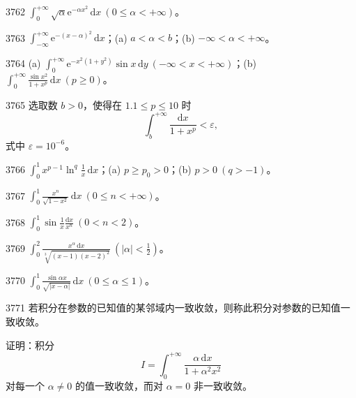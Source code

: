 \begin{prob}[S]{3762}
$\int_{0}^{+\infty} \sqrt{\alpha}\mathrm{e}^{-\alpha x^2}\,\mathrm{d}x \ (0 \leqslant \alpha < +\infty)$。
\end{prob}

\begin{prob}[M]{3763}
$\int_{-\infty}^{+\infty} \mathrm{e}^{-(x-\alpha)^2}\,\mathrm{d}x$；(a) $a < \alpha < b$；(b) $-\infty < \alpha < +\infty$。
\end{prob}

\begin{prob}[M]{3764}
(a) $\int_{0}^{+\infty} \mathrm{e}^{-x^2(1+y^2)} \sin x\,\mathrm{d}y \ (-\infty < x < +\infty)$；\qquad (b) $\int_{0}^{+\infty} \frac{\sin x^2}{1+x^p}\,\mathrm{d}x \ (p \geqslant 0)$。
\end{prob}

\begin{prob}[M]{3765}
选取数 $b > 0$，使得在 $1.1 \leqslant p \leqslant 10$ 时
\[
\int_{b}^{+\infty} \frac{\mathrm{d}x}{1+x^p} < \varepsilon,
\]
式中 $\varepsilon = 10^{-6}$。
\end{prob}

\begin{prob}[M]{3766}
$\int_{0}^{1} x^{p-1} \ln^q \frac{1}{x}\,\mathrm{d}x$；(a) $p \geqslant p_0 > 0$；(b) $p > 0 \ (q > -1)$。
\end{prob}

\begin{prob}[S]{3767}
$\int_{0}^{1} \frac{x^n}{\sqrt{1-x^2}}\,\mathrm{d}x \ (0 \leqslant n < +\infty)$。
\end{prob}

\begin{prob}[S]{3768}
$\int_{0}^{1} \sin \frac{1}{x}\frac{\mathrm{d}x}{x^n} \ (0 < n < 2)$。
\end{prob}

\begin{prob}[S]{3769}
$\int_{0}^{2} \frac{x^\alpha\,\mathrm{d}x}{\sqrt[3]{(x-1)(x-2)^2}} \ \left(|\alpha| < \frac{1}{2}\right)$。
\end{prob}

\begin{prob}[S]{3770}
$\int_{0}^{1} \frac{\sin \alpha x}{\sqrt{|x-\alpha|}}\,\mathrm{d}x \ (0 \leqslant \alpha \leqslant 1)$。
\end{prob}

\begin{prob}[M]{3771}
若积分在参数的已知值的某邻域内一致收敛，则称此积分对参数的已知值一致收敛。

证明：积分
\[
I = \int_{0}^{+\infty} \frac{\alpha\,\mathrm{d}x}{1+\alpha^2 x^2}
\]
对每一个 $\alpha \neq 0$ 的值一致收敛，而对 $\alpha = 0$ 非一致收敛。
\end{prob}

